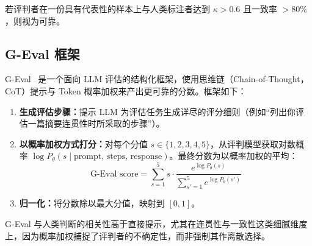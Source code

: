 若评判者在一份具有代表性的样本上与人类标注者达到 $\kappa > 0.6$ 且一致率 $> 80\%$，则视为可靠。

\subsection{G-Eval 框架}
\label{g-eval-framework}

G-Eval~\cite{liu2023geval} 是一个面向 LLM 评估的结构化框架，使用思维链（Chain-of-Thought，CoT）提示与 Token 概率加权来产出更可靠的分数。框架如下：

\begin{enumerate}
  \item \textbf{生成评估步骤：}提示 LLM 为评估任务生成详尽的评分细则（例如“列出你评估一篇摘要连贯性时所采取的步骤”）。
  \item \textbf{以概率加权方式打分：}对每个分值 $s \in \{1, 2, 3, 4, 5\}$，从评判模型获取对数概率 $\log P_\theta(s \mid \text{prompt, steps, response})$。最终分数为以概率加权的平均：
\begin{equation}
        \text{G-Eval score} = \sum_{s=1}^{5} s \cdot \frac{e^{\log P_\theta(s)}}{\sum_{s'=1}^{5} e^{\log P_\theta(s')}}
\end{equation}
  \item \textbf{归一化：}将分数除以最大分值，映射到 $[0, 1]$。
\end{enumerate}

G-Eval 与人类判断的相关性高于直接提示，尤其在连贯性与一致性这类细腻维度上，因为概率加权捕捉了评判者的不确定性，而非强制其作离散选择。

